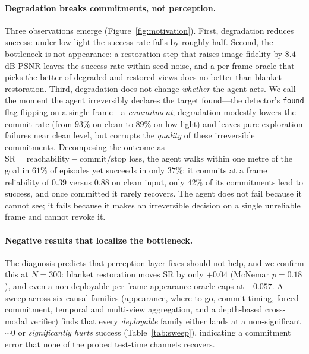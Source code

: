 \paragraph{Degradation breaks commitments, not perception.}
Three observations emerge (Figure~\ref{fig:motivation}). First, degradation
reduces success: under low light the success rate falls by roughly half.
Second, the bottleneck is not appearance: a restoration step that raises image
fidelity by $8.4$\,dB PSNR leaves the success rate within seed noise, and a
per-frame oracle that picks the better of degraded and restored views does no
better than blanket restoration. Third, degradation does not change
\emph{whether} the agent acts. We call the moment the agent irreversibly
declares the target found---the detector's \texttt{found} flag flipping on a
single frame---a \emph{commitment}; degradation modestly lowers the commit rate
(from $93\%$ on clean to $89\%$ on low-light) and leaves
pure-exploration failures near  clean level, but corrupts the
\emph{quality} of these irreversible commitments. Decomposing the outcome as
$\text{SR}=\text{reachability}-\text{commit/stop loss}$, the agent walks within
one metre of the goal in $61\%$ of episodes yet succeeds in only $37\%$; it
commits at a frame reliability of $0.39$ versus $0.88$ on clean input, only
$42\%$ of its commitments lead to success, and once committed it rarely
recovers. The agent does not fail because it cannot see; it fails because
it makes an irreversible decision on a single unreliable frame and cannot
revoke it.

\paragraph{Negative results that localize the bottleneck.}
The diagnosis predicts that perception-layer fixes should not help, and we
confirm this at $N{=}300$: blanket restoration moves SR by only $+0.04$
(McNemar $p{=}0.18$), and even a non-deployable per-frame appearance
oracle caps at $+0.057$. A sweep across six causal families (appearance,
where-to-go, commit timing, forced commitment, temporal and multi-view
aggregation, and a depth-based cross-modal verifier) finds that every
\emph{deployable} family either lands at a non-significant ${\sim}0$ or
\emph{significantly hurts} success (Table~\ref{tab:sweep}), indicating a
commitment error that none of the probed test-time channels recovers.

